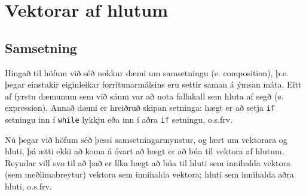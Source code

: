 





\chapter{Vektorar af hlutum}

\section{Samsetning}

Hingað til höfum við séð nokkur dæmi um samsetningu (e. composition), þ.e. þegar einstakir eiginleikar forritunarmálsins eru settir saman á ýmsan máta.
Eitt af fyrstu dæmunum sem við sáum var að nota fallakall sem hluta af segð (e. expression).
Annað dæmi er hreiðruð skipan setninga: hægt er að setja {\tt if} setningu inn í {\tt while} lykkju eða inn í aðra {\tt if} setningu, o.s.frv.

Nú þegar við höfum séð þessi samsetningarmynstur, og lært um vektorara og hluti, þá ætti ekki að koma á óvart að hægt er að búa til vektora af hlutum.
Reyndar vill svo til að það er líka hægt að búa til hluti sem innihalda vektora (sem meðlimabreytur) vektora sem innihalda vektora; hluti sem innihalda aðra hluti, o.s.frv.

